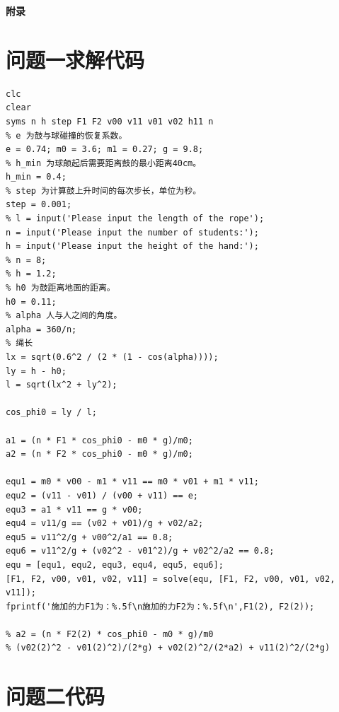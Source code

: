 \documentclass{cumcm}
\begin{document}


\begin{thebibliography}{99}
\end{thebibliography}

\newpage
\appendix
\textbf{附录}
\section{问题一求解代码}
\begin{lstlisting}
clc
clear
syms n h step F1 F2 v00 v11 v01 v02 h11 n
% e 为鼓与球碰撞的恢复系数。
e = 0.74; m0 = 3.6; m1 = 0.27; g = 9.8; 
% h_min 为球颠起后需要距离鼓的最小距离40cm。
h_min = 0.4;
% step 为计算鼓上升时间的每次步长，单位为秒。
step = 0.001;
% l = input('Please input the length of the rope');
n = input('Please input the number of students:');
h = input('Please input the height of the hand:');
% n = 8; 
% h = 1.2;
% h0 为鼓距离地面的距离。
h0 = 0.11;
% alpha 人与人之间的角度。
alpha = 360/n;
% 绳长
lx = sqrt(0.6^2 / (2 * (1 - cos(alpha))));
ly = h - h0;
l = sqrt(lx^2 + ly^2);

cos_phi0 = ly / l;

a1 = (n * F1 * cos_phi0 - m0 * g)/m0;
a2 = (n * F2 * cos_phi0 - m0 * g)/m0;

equ1 = m0 * v00 - m1 * v11 == m0 * v01 + m1 * v11;
equ2 = (v11 - v01) / (v00 + v11) == e;
equ3 = a1 * v11 == g * v00;
equ4 = v11/g == (v02 + v01)/g + v02/a2;
equ5 = v11^2/g + v00^2/a1 == 0.8;
equ6 = v11^2/g + (v02^2 - v01^2)/g + v02^2/a2 == 0.8;
equ = [equ1, equ2, equ3, equ4, equ5, equ6];
[F1, F2, v00, v01, v02, v11] = solve(equ, [F1, F2, v00, v01, v02, v11]);
fprintf('施加的力F1为：%.5f\n施加的力F2为：%.5f\n',F1(2), F2(2));

% a2 = (n * F2(2) * cos_phi0 - m0 * g)/m0
% (v02(2)^2 - v01(2)^2)/(2*g) + v02(2)^2/(2*a2) + v11(2)^2/(2*g)
\end{lstlisting}

\section{问题二代码}
\begin{lstlisting}
\end{lstlisting}
\end{document}
